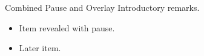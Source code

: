 \documentclass[14pt,t]{beamer}
\begin{document}
\begin{frame}{Combined Pause and Overlay}
Introductory remarks.
\pause
\begin{itemize}
\item<2-> Item revealed with pause.
\item<3-> Later item.
\end{itemize}
\end{frame}
\end{document}
